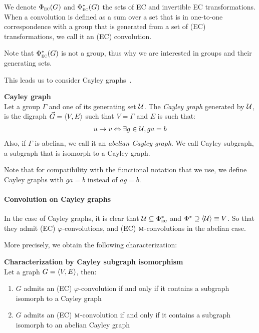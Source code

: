We denote $\Phi_{\operatorname{\textsc{ec}}}(G)$ and $\Phi^*_{\operatorname{\textsc{ec}}}(G)$ the sets of EC and invertible EC transformations. When a convolution is defined as a sum over a set that is in one-to-one correspondence with a group that is generated from a set of (EC) transformations, we call it an (EC) convolution.

\begin{remark}
Note that $\Phi^*_{\operatorname{\textsc{ec}}}(G)$ is not a group, thus why we are interested in groups and their generating sets.
\end{remark}

This leads us to consider Cayley graphs~\citep{cayley1878desiderata,wiki:cayley}.

\begin{definition}\textbf{Cayley graph}\\
Let a group $\Gamma$ and one of its generating set $\mathcal{U}$. The \emph{Cayley graph} generated by $\mathcal{U}$, is the digraph $\vec{G} = \langle V, E \rangle$ such that $V = \Gamma$ and $E$ is such that:
\begin{gather*}
u \rightarrow v \Leftrightarrow \exists g \in \mathcal{U}, ga = b
\end{gather*}
Also, if $\Gamma$ is abelian, we call it an \emph{abelian Cayley graph}. We call Cayley subgraph, a subgraph that is isomorph to a Cayley graph.
\end{definition}

\begin{remark}
Note that for compatibility with the functional notation that we use, we define Cayley graphs with $ga = b$ instead of $ag = b$.
\end{remark}

\paragraph{Convolution on Cayley graphs}
In the case of Cayley graphs, it is clear that $\mathcal{U} \subseteq \Phi^*_{\operatorname{\textsc{ec}}}$ and $\Phi^* \supseteq \langle \mathcal{U} \rangle \equiv V$. So that they admit (EC) $\varphi$-convolutions, and (EC) $\operatorname{\textsc{m}}$-convolutions in the abelian case.

More precisely, we obtain the following characterization:

\begin{proposition}\textbf{Characterization by Cayley subgraph isomorphism}\\
Let a graph $G = \langle V, E \rangle$, then:
\begin{enumerate}[label=(\roman*)]
\item $G$ admits an (EC) $\varphi$-convolution if and only if it contains a subgraph isomorph to a Cayley graph
\item $G$ admits an (EC) $\operatorname{\textsc{m}}$-convolution if and only if it contains a subgraph isomorph to an abelian Cayley graph
\end{enumerate}
\end{proposition}

